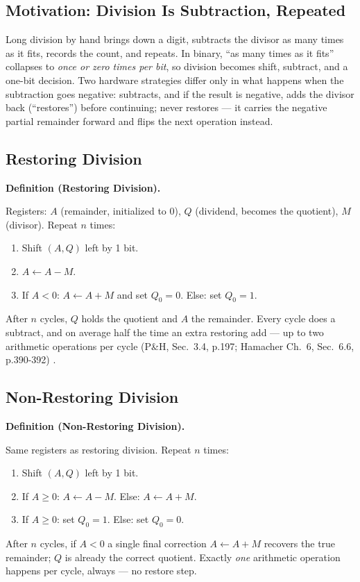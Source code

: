 \documentclass[11pt]{article}
\newenvironment{definitionbox}[1]{%
  \par\noindent\textbf{Definition (#1).}\ \itshape
}{\par\vspace{0.3em}}
\begin{document}
\subsection{Motivation: Division Is Subtraction, Repeated}

Long division by hand brings down a digit, subtracts the divisor as many times as it fits, records the count, and repeats. In binary, ``as many times as it fits'' collapses to \emph{once or zero times per bit}, so division becomes shift, subtract, and a one-bit decision. Two hardware strategies differ only in what happens when the subtraction goes negative:  subtracts, and if the result is negative, adds the divisor back (``restores'') before continuing;  never restores --- it carries the negative partial remainder forward and flips the next operation instead.

\subsection{Restoring Division}

\begin{definitionbox}{Restoring Division}
Registers: $A$ (remainder, initialized to 0), $Q$ (dividend, becomes the quotient), $M$ (divisor). Repeat $n$ times:
\begin{enumerate}
  \item Shift $(A,Q)$ left by 1 bit.
  \item $A \gets A - M$.
  \item If $A < 0$:  $A \gets A + M$ and set $Q_0 = 0$. Else: set $Q_0 = 1$.
\end{enumerate}
After $n$ cycles, $Q$ holds the quotient and $A$ the remainder. Every cycle does a subtract, and on average half the time an extra restoring add --- up to two arithmetic operations per cycle (P\&H, Sec.~3.4, p.197; Hamacher Ch.~6, Sec.~6.6, p.390-392) \cite{PattersonHennessy2017_computer_organization_design,Hamacher2002_computer_organization}.
\end{definitionbox}

\subsection{Non-Restoring Division}

\begin{definitionbox}{Non-Restoring Division}
Same registers as restoring division. Repeat $n$ times:
\begin{enumerate}
  \item Shift $(A,Q)$ left by 1 bit.
  \item If $A \ge 0$: $A \gets A - M$. Else: $A \gets A + M$.
  \item If $A \ge 0$: set $Q_0 = 1$. Else: set $Q_0 = 0$.
\end{enumerate}
After $n$ cycles, if $A < 0$ a single final correction $A \gets A + M$ recovers the true remainder; $Q$ is already the correct quotient. Exactly \emph{one} arithmetic operation happens per cycle, always --- no restore step.
\end{definitionbox}
\end{document}
